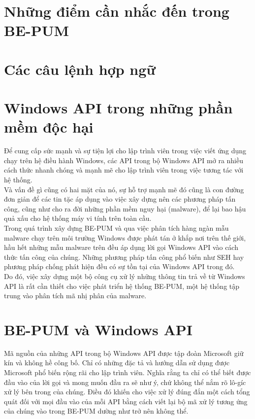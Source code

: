 \section{Những điểm cần nhắc đến trong BE-PUM}
\section{Các câu lệnh hợp ngữ}
\section{Windows API trong những phần mềm độc hại}
Để cung cấp sức mạnh và sự tiện lợi cho lập trình viên trong việc viết ứng dụng chạy trên hệ điều hành Windows, các API trong bộ Windows API mở ra nhiều cách thức nhanh chóng và mạnh mẽ cho lập trình viên trong việc tương tác với hệ thống.\\

Và vấn đề gì cũng có hai mặt của nó, sự hỗ trợ mạnh mẽ đó cũng là con đường đơn giản để các tin tặc áp dụng vào việc xây dựng nên các phương pháp tấn công, cũng như cho ra đời những phần mềm nguy hại (malware), để lại bao hậu quả xấu cho hệ thống máy vi tính trên toàn cầu.\\

Trong quá trình xây dựng BE-PUM và qua việc phân tích hàng ngàn mẫu malware chạy trên môi trường Windows được phát tán ở khắp nơi trên thế giới, hầu hết những mẫu malware trên đều áp dụng lời gọi Windows API vào cách thức tấn công của chúng. Những phương pháp tấn công phổ biến như SEH hay phương pháp chống phát hiện đều có sự tồn tại của Windows API trong đó.\\

Do đó, việc xây dựng một bộ công cụ xử lý những thông tin trả về từ Windows API là rất cần thiết cho việc phát triển hệ thống BE-PUM, một hệ thống tập trung vào phân tích mã nhị phân của malware.\\

\section{BE-PUM và Windows API}

Mã nguồn của những API trong bộ Windows API được tập đoàn Microsoft giữ kín và không hề công bố. Chỉ có những đặc tả và hướng dẫn sử dụng được Microsoft phổ biến rộng rãi cho lập trình viên. Nghĩa rằng ta chỉ có thể biết được đầu vào của lời gọi và mong muốn đầu ra sẽ như ý, chứ không thể nắm rõ lô-gíc xử lý bên trong của chúng. Điều đó khiến cho việc xử lý đúng đắn một cách tổng quát đối với mọi đầu vào của mỗi API bằng cách viết lại bộ mã xử lý tương ứng của chúng vào trong BE-PUM dường như trở nên không thể.\\

